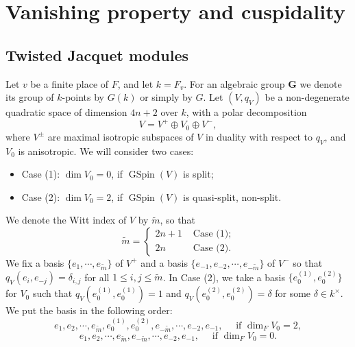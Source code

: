 \documentclass[12pt]{amsart}
\newcommand{\wt}{\widetilde}
\theoremstyle{remark}
\DeclareMathOperator{\GSpin}{GSpin}
\begin{document}
 


\section{Vanishing property and cuspidality}
\label{section-vanishing-and-cuspidality}


\subsection{Twisted Jacquet modules}

Let $v$ be a finite place of $F$, and let $k=F_v$. For an algebraic group $\mathbf{G}$ we denote its group of $k$-points by $G(k)$ or simply by $G$. Let $(V, q_V)$ be a non-degenerate quadratic space of dimension $4n+2$ over
$k$, with a polar decomposition
\begin{equation*}V=V^+\oplus V_0 \oplus V^-,\end{equation*}
where $V^{\pm}$ are maximal isotropic subspaces of $V$ in duality with respect to $q_V$, and $V_0$ is anisotropic. We will consider two cases:
\begin{itemize}
 \item Case (1): $\dim V_0=0$, if $\GSpin(V)$ is split;
 \item Case (2):  $\dim V_0=2$, if $\GSpin(V)$ is quasi-split, non-split.
\end{itemize}
We denote the Witt index of $V$ by $\wt m$, so that
\begin{equation*}
\wt m =	\begin{cases}
	2n+1 &\text{ Case (1)};\\
	2n	&\text{ Case (2)}.
	\end{cases}
\end{equation*}
We fix a basis $\{e_1, \cdots, e_{\wt m}\}$ of $V^+$ and a basis $\{e_{-1}, e_{-2}, \cdots, e_{-\wt m}\}$ of $V^-$ so that $q_V(e_i, e_{-j})=\delta_{i,j}$ for all $1\le i, j\le \wt m$. In Case (2), we take a basis $\{e_0^{(1)}, e_0^{(2)}\}$ for $V_0$ such that $q_V(e_0^{(1)}, e_0^{(1)})=1$ and $q_V(e_0^{(2)}, e_0^{(2)})=\delta$ for some $\delta\in k^\times$.  
We put the basis in the following order:
\begin{equation*}
e_1, e_2, \cdots, e_{\tilde{m}}, e_0^{(1)}, e_0^{(2)},  	e_{-\tilde{m}}, \cdots, e_{-2}, e_{-1}, \quad \textrm{ if } \dim_F V_0=2, 
\end{equation*}
\begin{equation*}
e_1, e_2, \cdots, e_{\tilde{m}},	e_{-\tilde{m}}, \cdots, e_{-2}, e_{-1}, \quad \textrm{ if } \dim_F V_0=0.
\end{equation*}
\end{document}
